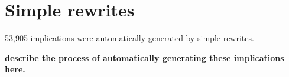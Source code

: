 \chapter{Simple rewrites}

\href{https://github.com/teorth/equational_theories/tree/main/equational_theories/SimpleRewrites/theorems}{53,905 implications} were automatically generated by simple rewrites.

{\bf describe the process of automatically generating these implications here.}

